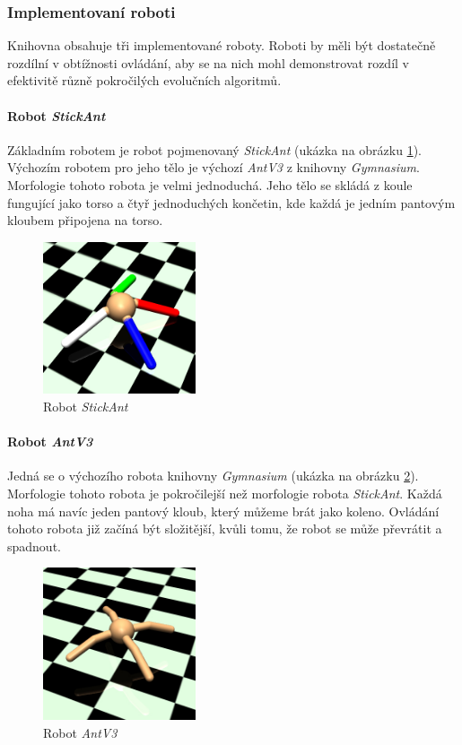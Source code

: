 \subsubsection{Implementovaní roboti}
Knihovna obsahuje tři implementované roboty. Roboti by měli být dostatečně
rozdílní v obtížnosti ovládání, aby se na nich mohl demonstrovat rozdíl v
efektivitě různě pokročilých evolučních algoritmů.

\paragraph{Robot \emph{StickAnt}} \label{imp:robots.StickAnt}
Základním robotem je robot pojmenovaný \emph{StickAnt} (ukázka na obrázku
\ref{imp:fig:robots.StickAnt}). Výchozím robotem pro jeho tělo je výchozí
\emph{AntV3} z knihovny \emph{Gymnasium}. Morfologie tohoto robota je velmi
jednoduchá. Jeho tělo se skládá z koule fungující jako torso a čtyř
jednoduchých končetin, kde každá je jedním pantovým kloubem připojena na torso.
\begin{figure}[!htb]
    \centering
    \includegraphics[width=0.4\textwidth]{../img/crop_Basic-Ant.jpg}
    \caption{Robot \emph{StickAnt}}
    \label{imp:fig:robots.StickAnt}
\end{figure}

\paragraph{Robot \emph{AntV3}} \label{imp:robots.Ant}
Jedná se o výchozího robota knihovny \emph{Gymnasium} (ukázka na obrázku
\ref{imp:fig:robots.AntV3}). Morfologie tohoto robota je pokročilejší než
morfologie robota \emph{StickAnt}. Každá noha má navíc jeden pantový kloub,
který můžeme brát jako koleno. Ovládání tohoto robota již začíná být
složitější, kvůli tomu, že robot se může převrátit a spadnout.
\begin{figure}[!htb]
    \centering
    \includegraphics[width=0.4\textwidth]{../img/crop_Ant-v3.jpg}
    \caption{Robot \emph{AntV3}}
    \label{imp:fig:robots.AntV3}
\end{figure}

